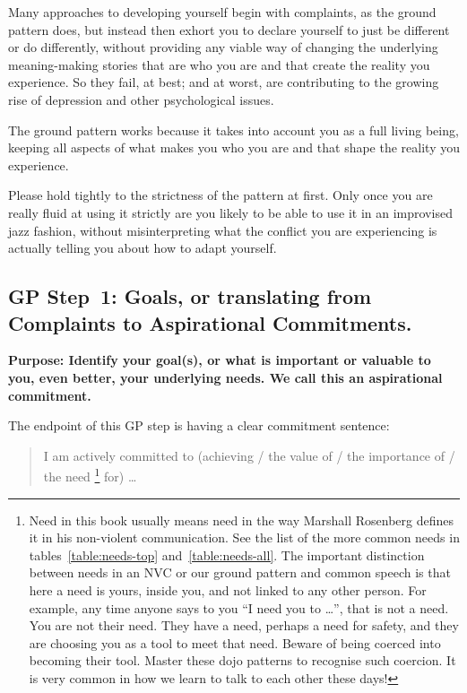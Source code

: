 Many approaches to developing yourself begin with complaints, as the ground pattern does, but instead then exhort you to declare yourself to just be different or do differently, without providing any viable way of changing the underlying meaning-making stories that are who you are and that create the reality you experience. So they fail, at best; and at worst, are contributing to the growing rise of depression and other psychological issues\cite{wilson-redirect}. 


The ground pattern works because it takes into account you as a full living being, keeping all aspects of what makes you who you are and that shape the reality you experience.


Please hold tightly to the strictness of the pattern at first. Only once you are really fluid at using it strictly are you likely to be able to use it in an improvised jazz fashion, without misinterpreting what the conflict you are experiencing is actually telling you about how to adapt yourself.


\subsection[GP Step~1: From Complaints to Aspirational Commitments] {GP Step~1: Goals, 
or translating from Complaints to Aspirational Commitments.}
\textbf{Purpose: Identify your goal(s), or what is important or valuable to you, even better, your underlying needs. We call this an aspirational commitment.} ~


The endpoint of this GP step is having a clear commitment sentence:


\begin{quote}
I am actively committed to (achieving / the value of / the importance of / the need
\footnote{Need in this book usually means need in the way Marshall Rosenberg defines it in his non-violent communication. See the list of the more common needs in tables~\ref{table:needs-top} and~\ref{table:needs-all}. The important distinction between needs in an NVC or our ground pattern and common speech is that here a need is yours, inside you, and not linked to any other person. For example, any time anyone says to you “I need you to …”, that is not a need. You are not their need. They have a need, perhaps a need for safety, and they are choosing you as a tool to meet that need. Beware of being coerced into becoming their tool. Master these dojo patterns to recognise such coercion. It is very common in how we learn to talk to each other these days!} 
for) \ldots
\end{quote}


